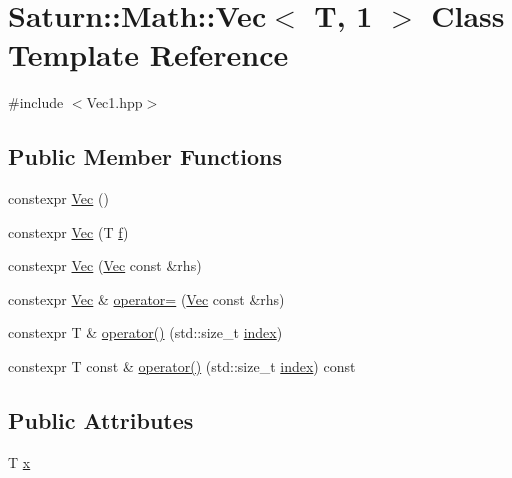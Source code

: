 \hypertarget{class_saturn_1_1_math_1_1_vec_3_01_t_00_011_01_4}{}\section{Saturn\+:\+:Math\+:\+:Vec$<$ T, 1 $>$ Class Template Reference}
\label{class_saturn_1_1_math_1_1_vec_3_01_t_00_011_01_4}


{\ttfamily \#include $<$Vec1.\+hpp$>$}

\subsection*{Public Member Functions}
\begin{DoxyCompactItemize}
\item 
constexpr \mbox{\hyperlink{class_saturn_1_1_math_1_1_vec_3_01_t_00_011_01_4_af9feaded166a2b4091c411e308489598}{Vec}} ()
\item 
constexpr \mbox{\hyperlink{class_saturn_1_1_math_1_1_vec_3_01_t_00_011_01_4_a79ca7d3fe3512a7e9515ec4a156cb9d7}{Vec}} (T \mbox{\hyperlink{glad_8h_a6a8efad2e332fcd916bde9e19ddef215}{f}})
\item 
constexpr \mbox{\hyperlink{class_saturn_1_1_math_1_1_vec_3_01_t_00_011_01_4_ac6aaeea7904fc3177bb01601b0393592}{Vec}} (\mbox{\hyperlink{class_saturn_1_1_math_1_1_vec}{Vec}} const \&rhs)
\item 
constexpr \mbox{\hyperlink{class_saturn_1_1_math_1_1_vec}{Vec}} \& \mbox{\hyperlink{class_saturn_1_1_math_1_1_vec_3_01_t_00_011_01_4_a41d6b2c0c83f52484fa878221448882a}{operator=}} (\mbox{\hyperlink{class_saturn_1_1_math_1_1_vec}{Vec}} const \&rhs)
\item 
constexpr T \& \mbox{\hyperlink{class_saturn_1_1_math_1_1_vec_3_01_t_00_011_01_4_a4e8afbdf70badbf72df737e618888883}{operator()}} (std\+::size\+\_\+t \mbox{\hyperlink{glad_8h_ab47dd9958bcadea08866b42bf358e95e}{index}})
\item 
constexpr T const  \& \mbox{\hyperlink{class_saturn_1_1_math_1_1_vec_3_01_t_00_011_01_4_a1be6b30d71f2b64487a618ed6d2fc95e}{operator()}} (std\+::size\+\_\+t \mbox{\hyperlink{glad_8h_ab47dd9958bcadea08866b42bf358e95e}{index}}) const
\end{DoxyCompactItemize}
\subsection*{Public Attributes}
\begin{DoxyCompactItemize}
\item 
T \mbox{\hyperlink{class_saturn_1_1_math_1_1_vec_3_01_t_00_011_01_4_a3bb5ecb700a25500b9119c5bc3f4320d}{x}}
\end{DoxyCompactItemize}


